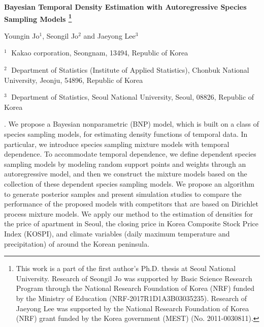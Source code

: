 \documentclass[12pt]{article}
\begin{document}
\begin{flushleft}


{\LARGE\bf Bayesian Temporal Density Estimation with Autoregressive Species Sampling Models
	\footnote{This work is a part of the first author's Ph.D. thesis at Seoul National University.
		Research of Seongil Jo was supported by Basic Science Research Program through the National Research Foundation of Korea (NRF) funded by the Ministry of Education (NRF-2017R1D1A3B03035235). Research of Jaeyong Lee was supported by the National Research Foundation of Korea (NRF) grant funded by the Korea government (MEST) (No. 2011-0030811).}}


\vspace{1.0cm}

Youngin Jo$^1$, Seongil Jo$^2$ and Jaeyong Lee$^3$

\begin{description}

\item $^1 \;$ Kakao corporation, Seongnam, 13494, Republic of Korea
\item $^2 \;$ Department of Statistics (Institute of Applied Statistics), Chonbuk National University,
Jeonju, 54896, Republic of Korea 

\item $^3 \;$ Department of Statistics, Seoul National University, Seoul, 08826, Republic of Korea

\end{description}

\end{flushleft}


\vspace{0.75cm}

. We propose a Bayesian nonparametric (BNP) model, which is built on a class of species sampling models, for estimating density functions of temporal data. In particular, we introduce species sampling mixture models with temporal dependence. To accommodate temporal dependence, we define dependent species sampling models by modeling random support points and weights through an autoregressive model, and then we construct the mixture models based on the collection of these dependent species sampling models. We propose an algorithm to generate posterior samples and present simulation studies to compare the performance of the proposed models with competitors that are based on Dirichlet process mixture models. We apply our method to the estimation of densities for the price of apartment in Seoul, the closing price in Korea Composite Stock Price Index (KOSPI), and climate variables (daily maximum temperature and precipitation) of around the Korean peninsula.
\end{document}
